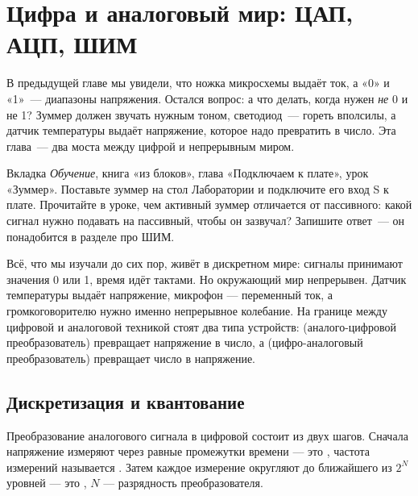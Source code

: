 \chapter{Цифра и аналоговый мир: ЦАП, АЦП, ШИМ}
\label{ch:analog}

В предыдущей главе мы увидели, что ножка микросхемы выдаёт ток, а «0» и «1»~---
диапазоны напряжения. Остался вопрос: а что делать, когда нужен \emph{не} 0 и
не 1? Зуммер должен звучать нужным тоном, светодиод~--- гореть вполсилы, а
датчик температуры выдаёт напряжение, которое надо превратить в число. Эта
глава~--- два моста между цифрой и непрерывным миром.

\begin{buildbox}
Вкладка \emph{Обучение}, книга «из блоков», глава «Подключаем к плате», урок
«Зуммер». Поставьте зуммер на стол Лаборатории и подключите его вход S к
плате. Прочитайте в уроке, чем активный зуммер отличается от пассивного:
какой сигнал нужно подавать на пассивный, чтобы он зазвучал? Запишите
ответ~--- он понадобится в разделе про ШИМ.
\end{buildbox}

Всё, что мы изучали до сих пор, живёт в дискретном мире: сигналы принимают
значения 0 или 1, время идёт тактами. Но окружающий мир непрерывен. Датчик
температуры выдаёт напряжение, микрофон --- переменный ток, а громкоговорителю
нужно именно непрерывное колебание. На границе между цифровой и аналоговой
техникой стоят два типа устройств:  (аналого-цифровой преобразователь)
превращает напряжение в число, а  (цифро-аналоговый преобразователь)
превращает число в напряжение.

\section{Дискретизация и квантование}

Преобразование аналогового сигнала в цифровой состоит из двух шагов. Сначала
напряжение измеряют через равные промежутки времени --- это
, частота измерений называется . Затем каждое измерение округляют до ближайшего из
$2^N$ уровней --- это , $N$ --- разрядность преобразователя.

